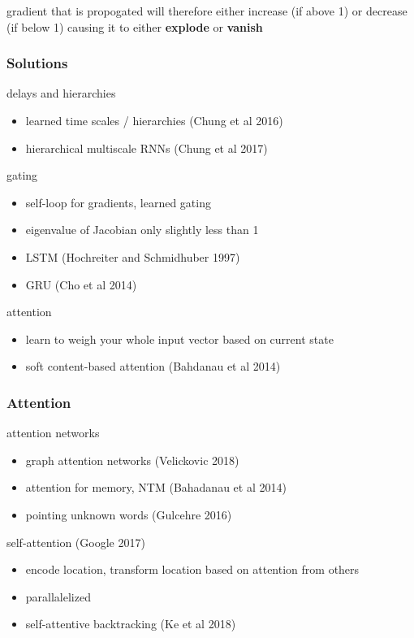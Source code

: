 \documentclass[]{article}
\theoremstyle{definition}
\begin{document}
    gradient that is propogated will therefore either increase (if above 1) or decrease (if below 1) causing it to either \textbf{explode} or \textbf{vanish}


    \subsubsection{Solutions}%
    \label{ssub:solutions}

    delays and hierarchies
    \begin{itemize}
        \item learned time scales / hierarchies (Chung et al 2016)
        \item hierarchical multiscale RNNs (Chung et al 2017)
    \end{itemize}

    gating
    \begin{itemize}
        \item self-loop for gradients, learned gating
        \item eigenvalue of Jacobian only slightly less than 1
        \item LSTM (Hochreiter and Schmidhuber 1997)
        \item GRU (Cho et al 2014)
    \end{itemize}

    attention
    \begin{itemize}
        \item learn to weigh your whole input vector based on current state
        \item soft content-based attention (Bahdanau et al 2014)
    \end{itemize}


    \subsubsection{Attention}%
    \label{ssub:attention}

    attention networks
    \begin{itemize}
        \item graph attention networks (Velickovic 2018)
        \item attention for memory, NTM (Bahadanau et al 2014)
        \item pointing unknown words (Gulcehre 2016)
    \end{itemize}

    self-attention (Google 2017)
    \begin{itemize}
        \item encode location, transform location based on attention from others
        \item parallalelized
        \item self-attentive backtracking (Ke et al 2018)
    \end{itemize}
\end{document}
